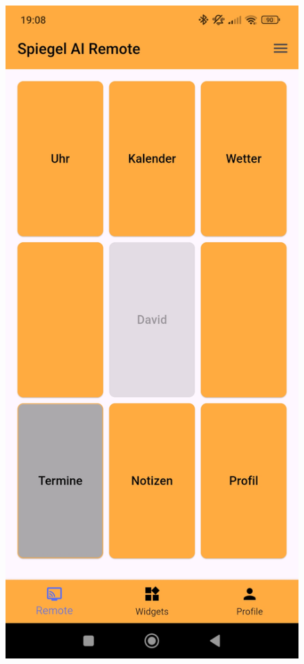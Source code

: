 \begin{figure}[h]
\begin{minipage}[b]{0.27\textwidth}
        \includegraphics[width=\textwidth]{pictures/remote_remote.jpg}

\end{minipage}
\end{figure}
